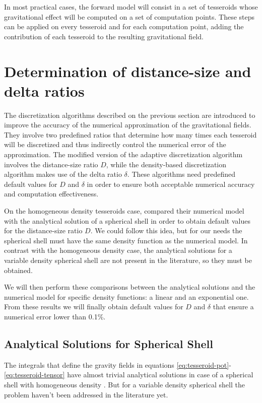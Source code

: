\documentclass[extra]{gji}
\begin{document}
In most practical cases, the forward model will consist in a set of
tesseroids whose gravitational effect will be computed on a set of
computation points.
These steps can be applied on every tesseroid and for each computation point,
adding the contribution of each tesseroid to the resulting
gravitational field.



\section{Determination of distance-size and delta ratios}

The discretization algorithms described on the previous section are
introduced to improve the accuracy of the numerical approximation of
the gravitational fields.
They involve two predefined ratios that determine how many
times each tesseroid will be discretized and thus indirectly control
the numerical error of the approximation.
The modified version of the adaptive discretization algorithm involves
the distance-size ratio $D$, while the density-based discretization
algorithm makes use of the delta ratio $\delta$.
These algorithms need predefined default values for $D$ and $\delta$
in order to ensure both acceptable numerical accuracy and computation
effectiveness.

On the homogeneous density tesseroids case, \citet{Uieda2016} compared
their numerical model with the analytical solution of a spherical
shell in order to obtain default values for the distance-size ratio
$D$.
We could follow this idea, but for our needs the spherical shell must
have the same density function as the numerical model.
In contrast with the homogeneous density case, the analytical solutions
for a variable density spherical shell are not present in the
literature, so they must be obtained.

We will then perform these comparisons between the analytical solutions
and the numerical model for specific density functions: a linear and an
exponential one.
From these results we will finally obtain default values for $D$
and $\delta$ that ensure a numerical error lower than 0.1\%.


\subsection{Analytical Solutions for Spherical Shell}

The integrals that define the gravity fields in equations
\ref{eq:tesseroid-pot}-\ref{eq:tesseroid-tensor} have almost trivial
analytical solutions in case of a spherical shell with homogeneous
density \citep{Mikuska2006,Grombein2013}.
But for a variable density spherical shell the problem haven't been
addressed in the literature yet.
\end{document}
